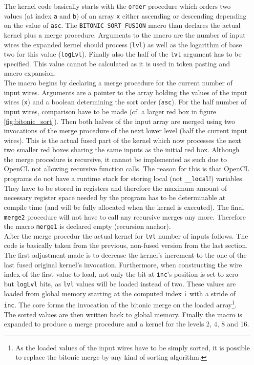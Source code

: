 The kernel code basically starts with the \lstinline!order! procedure which orders two values (at index \lstinline!a! and \lstinline!b!) of an array \lstinline!x! either ascending or descending depending on the value of \lstinline!asc!. The \lstinline!BITONIC_SORT_FUSION! macro than declares the actual kernel plus a merge procedure. Arguments to the macro are the number of input wires the expanded kernel should process (\lstinline!lvl!) as well as the logarithm of base two for this value (\lstinline!logLvl!). Finally also the half of the \lstinline!lvl! argument has to be specified. This value cannot be calculated as it is used in token pasting and macro expansion. \\
The macro begins by declaring a merge procedure for the current number of input wires. Arguments are a pointer to the array holding the values of the input wires (\lstinline!x!) and a boolean determining the sort order (\lstinline!asc!). For the half number of input wires, comparison have to be made (cf. a larger red box in figure \ref{fig:bitonic_sort}). Then both halves of the input array are merged using two invocations of the merge procedure of the next lower level (half the current input wires). This is the actual fused part of the kernel which now processes the next two smaller red boxes sharing the same inputs as the initial red box. Although the merge procedure is recursive, it cannot be implemented as such due to OpenCL not allowing recursive function calls. The reason for this is that OpenCL programs do not have a runtime stack for storing local (not \lstinline!__local!!) variables. They have to be stored in registers and therefore the maximum amount of necessary register space needed by the program has to be determinable at compile time (and will be fully allocated when the kernel is executed). The final \lstinline!merge2! procedure will not have to call any recursive merges any more. Therefore the macro \lstinline!merge1! is declared empty (recursion anchor). \\
After the merge procedur the actual kernel for \lstinline!lvl! number of inputs follows. The code is basically taken from the previous, non-fused version from the last section. The first adjustment made is to decrease the kernel's increment to the one of  the last fused original kernel's invocation. Furthermore, when constructing the wire index of the first value to load, not only the bit at \lstinline!inc!'s position is set to zero but \lstinline!logLvl! bits, as \lstinline!lvl! values will be loaded instead of two. These values are loaded from global memory starting at the computed index \lstinline!i! with a stride of \lstinline!inc!. The core forms the invocation of the bitonic merge on the loaded array\footnote{As the loaded values of the input wires have to be simply sorted, it is possible to replace the bitonic merge by any kind of sorting algorithm.}. The sorted values are then written back to global memory.
Finally the macro is expanded to produce a merge procedure and a kernel for the levels 2, 4, 8 and 16.

